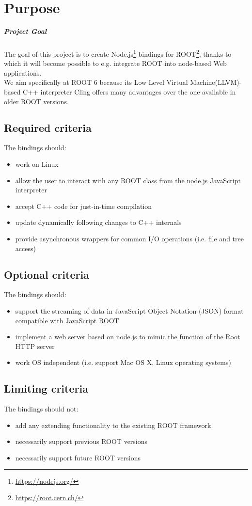 \chapter{Purpose}
\paragraph{Project Goal}
The goal of this project is to create Node.js\textsuperscript{\textregistered}\footnote{\url{https://nodejs.org/}} bindings for
ROOT\footnote{\url{https://root.cern.ch/}}, thanks to which it will become possible to e.g. integrate ROOT into node-based Web applications.\\
We aim specifically at ROOT 6 because its Low Level Virtual Machine(LLVM)-based C++ interpreter Cling offers many advantages over the one available in older ROOT versions.
\section{Required criteria}
The bindings should:
\begin{itemize}
	\item work on Linux
	\item allow the user to interact with any ROOT class from the node.js JavaScript interpreter
	\item accept C++ code for just-in-time compilation
	\item update dynamically following changes to C++ internals
	\item provide asynchronous wrappers for common I/O operations (i.e. file and tree access)
\end{itemize}

\section{Optional criteria}
The bindings should:
\begin{itemize}
	\item support the streaming of data in JavaScript Object Notation (JSON) format compatible with JavaScript ROOT
	\item implement a web server based on node.js to mimic the function of the Root HTTP server
	\item work OS independent (i.e. support Mac OS X, Linux operating systems)
\end{itemize}

\section{Limiting criteria}
The bindings should not:
\begin{itemize}
	\item add any extending functionality to the existing ROOT framework
	\item necessarily support previous ROOT versions
	\item necessarily support future ROOT versions
\end{itemize}
